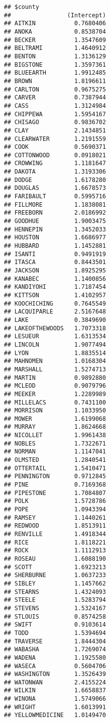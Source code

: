 \documentclass[
]{article}
\begin{document}
\begin{verbatim}
## $county
##                (Intercept)
## AITKIN           0.7680406
## ANOKA            0.8538704
## BECKER           1.3547609
## BELTRAMI         1.4640912
## BENTON           1.3136129
## BIGSTONE         1.3597361
## BLUEEARTH        1.9912485
## BROWN            1.8196611
## CARLTON          0.9675275
## CARVER           0.7387944
## CASS             1.3124984
## CHIPPEWA         1.5954167
## CHISAGO          0.9836702
## CLAY             2.1434851
## CLEARWATER       1.2191559
## COOK             0.5690371
## COTTONWOOD       0.0918021
## CROWWING         1.1181647
## DAKOTA           1.3193306
## DODGE            1.6178280
## DOUGLAS          1.6678573
## FARIBAULT        0.5995716
## FILLMORE         1.1838081
## FREEBORN         2.0186992
## GOODHUE          1.9003475
## HENNEPIN         1.3452033
## HOUSTON          1.6686977
## HUBBARD          1.1452881
## ISANTI           0.9491919
## ITASCA           0.8443501
## JACKSON          1.8925295
## KANABEC          1.1400856
## KANDIYOHI        1.7187454
## KITTSON          1.4102957
## KOOCHICHING      0.7645549
## LACQUIPARLE      2.5167648
## LAKE             0.3849690
## LAKEOFTHEWOODS   1.7073318
## LESUEUR          1.6313534
## LINCOLN          1.9077494
## LYON             1.8835514
## MAHNOMEN         1.0168304
## MARSHALL         1.5274713
## MARTIN           0.9892880
## MCLEOD           0.9079796
## MEEKER           1.2289989
## MILLELACS        0.7431100
## MORRISON         1.1033950
## MOWER            1.6199068
## MURRAY           1.8624668
## NICOLLET         1.9961438
## NOBLES           1.7322671
## NORMAN           1.1147041
## OLMSTED          1.2840541
## OTTERTAIL        1.5410471
## PENNINGTON       0.9712845
## PINE             0.7169368
## PIPESTONE        1.7084807
## POLK             1.5728786
## POPE             1.0943394
## RAMSEY           1.1440261
## REDWOOD          1.8513911
## RENVILLE         1.4918344
## RICE             1.8118221
## ROCK             1.1112913
## ROSEAU           1.6088190
## SCOTT            1.6923213
## SHERBURNE        1.0637233
## SIBLEY           1.1457662
## STEARNS          1.4324093
## STEELE           1.5283794
## STEVENS          1.5324167
## STLOUIS          0.8574258
## SWIFT            0.9103614
## TODD             1.5394694
## TRAVERSE         1.8444304
## WABASHA          1.7269074
## WADENA           1.1925580
## WASECA           0.5604706
## WASHINGTON       1.3526439
## WATONWAN         2.4155224
## WILKIN           1.6658837
## WINONA           1.5749066
## WRIGHT           1.6013991
## YELLOWMEDICINE   1.0149470
\end{verbatim}
\end{document}
